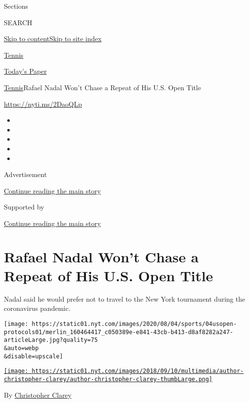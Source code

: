 Sections

SEARCH

\protect\hyperlink{site-content}{Skip to
content}\protect\hyperlink{site-index}{Skip to site index}

\href{https://www.nytimes.com/section/sports/tennis}{Tennis}

\href{https://myaccount.nytimes.com/auth/login?response_type=cookie\&client_id=vi}{}

\href{https://www.nytimes.com/section/todayspaper}{Today's Paper}

\href{/section/sports/tennis}{Tennis}\textbar{}Rafael Nadal Won't Chase
a Repeat of His U.S. Open Title

\url{https://nyti.ms/2DaoQLp}

\begin{itemize}
\item
\item
\item
\item
\item
\end{itemize}

Advertisement

\protect\hyperlink{after-top}{Continue reading the main story}

Supported by

\protect\hyperlink{after-sponsor}{Continue reading the main story}

\hypertarget{rafael-nadal-wont-chase-a-repeat-of-his-us-open-title}{%
\section{Rafael Nadal Won't Chase a Repeat of His U.S. Open
Title}\label{rafael-nadal-wont-chase-a-repeat-of-his-us-open-title}}

Nadal said he would prefer not to travel to the New York tournament
during the coronavirus pandemic.

\texttt{[image: https://static01.nyt.com/images/2020/08/04/sports/04usopen-protocols01/merlin\_160464417\_c050389e-e841-43cb-b413-d8af8282a247-articleLarge.jpg?quality=75\\\&auto=webp\\\&disable=upscale]}

\href{https://www.nytimes.com/by/christopher-clarey}{\texttt{[image: https://static01.nyt.com/images/2018/09/10/multimedia/author-christopher-clarey/author-christopher-clarey-thumbLarge.png]}}

By \href{https://www.nytimes.com/by/christopher-clarey}{Christopher
Clarey}

